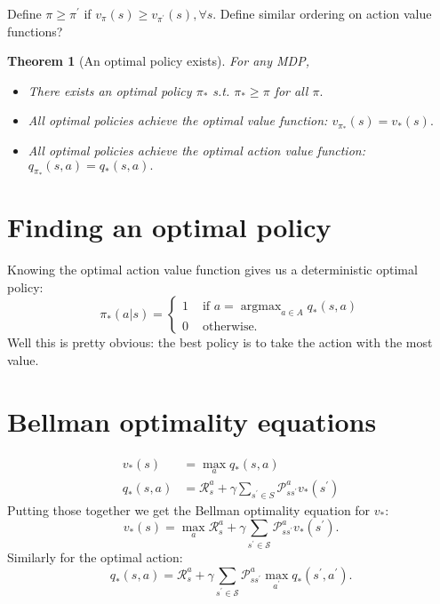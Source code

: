 \documentclass[12pt]{article}
\theoremstyle{plain}
\newtheorem{theorem}{Theorem}
\theoremstyle{definition}
\theoremstyle{remark}
\begin{document}
Define \( \pi \geq \pi ^ { \prime } \) if \( v _ { \pi } ( s ) \geq v _ { \pi ^ { \prime } } ( s ) , \forall s. \) Define similar ordering on action value functions?

\begin{theorem}[An optimal policy exists]
  For any MDP,
  \begin{itemize}
    \item There exists an optimal policy \( \pi_* \) s.t. \( \pi_* \geq \pi \)
    for all \( \pi. \)
    \item All optimal policies achieve the optimal value function: \( v_{\pi_*}
    (s) = v_*(s). \)
    \item All optimal policies achieve the optimal action value function: \(
    q_{\pi_*} (s, a) = q_*(s, a). \)
  \end{itemize}
\end{theorem}

\section{Finding an optimal policy}

Knowing the optimal action value function gives us a deterministic optimal policy:
\[
\pi _ { * } ( a | s ) = \left\{
  \begin{array} { ll }
    { 1 } & { \text { if } a = \operatorname { argmax }_{a\in A} q_*(s, a) } \\
    { 0 } & { \text { otherwise. } }
  \end{array}
\right.
\]
Well this is pretty obvious: the best policy is to take the action with the most
value.

\section{Bellman optimality equations}

\begin{align*}
v _ { * } ( s ) &= \max _ { a } q _ { * } ( s , a ) \\
q _ { * } ( s , a ) &= \mathcal { R } _ { s } ^ { a } + \gamma \sum _ { s ^ { \prime } \in S } \mathcal { P } _ { s s ^ { ' } } ^ { a } v _ { * } \left( s ^ { \prime } \right)
\end{align*}
Putting those together we get the Bellman optimality equation for \( v_*: \)
\[
v _ { * } ( s ) = \max _ { a } \mathcal { R } _ { s } ^ { a } + \gamma \sum _ { s ^ { \prime } \in \mathcal { S } } \mathcal { P } _ { s s ^ { \prime } } ^ { a } v _ { * } \left( s ^ { \prime } \right).
\]
Similarly for the optimal action:
\[
q _ { * } ( s , a ) = \mathcal { R } _ { s } ^ { a } + \gamma \sum _ { s ^ { \prime } \in \mathcal { S } } \mathcal { P } _ { s s ^ { \prime } } ^ { a } \max _ { a ^ { \prime } } q _ { * } \left( s ^ { \prime } , a ^ { \prime } \right).
\]
\end{document}
